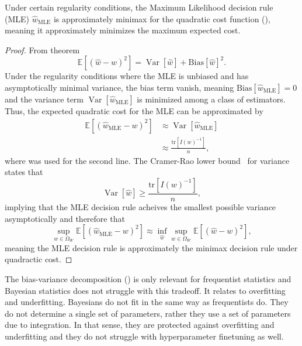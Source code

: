 \begin{corollary}
	\label{cor:MLE_minimax}
	Under certain regularity conditions, the Maximum Likelihood decision rule (MLE) $\hat{w}_{\text{MLE}}$ is approximately minimax for the quadratic cost function (), meaning it approximately minimizes the maximum expected cost.
	
	\begin{proof}
		From theorem 
		\begin{equation}
			\mathbb{E}[(\hat{w}-w)^2] = \operatorname{Var}[\hat{w}]+\text{Bias}[\hat{w}]^2.
		\end{equation}
		Under the regularity conditions where the MLE is unbiased and has asymptotically minimal variance, the bias term vanish, meaning $\text{Bias}[\hat{w}_{\text{MLE}}] = 0$ and the variance term $\operatorname{Var}[\hat{w}_{\text{MLE}}]$ is minimized among a class of estimators. Thus, the expected quadratic cost for the MLE can be approximated by
		\begin{equation}
			\begin{split}
				\mathbb{E}[(\hat{w}_{\text{MLE}}-w)^2] &\approx \operatorname{Var}[\hat{w}_{\text{MLE}}]\\
				&\approx \frac{\text{tr}[I(w)^{-1}]}{n},
			\end{split}
		\end{equation}
		where  was used for the second line. The Cramer-Rao lower bound~\citep{Rao1973Linear} for variance states that 
		\begin{equation}
			\operatorname{Var}[\hat{w}]\geq \frac{\text{tr}[I(w)^{-1}]}{n},
		\end{equation}
		implying that the MLE decision rule acheives the smallest possible variance asymptotically and therefore that 
		\begin{equation}
			\sup_{w\in \Omega_W}\mathbb{E}[(\hat{w}_{\text{MLE}}-w)^2]\approx \inf_{\hat{w}} \sup_{w \in \Omega_W} \mathbb{E}[(\hat{w} - w)^2],
		\end{equation}
		meaning the MLE decision rule is approximately the minimax decision rule under quadractic cost.
	\end{proof}
\end{corollary}

\begin{example}
	The bias-variance decomposition () is only relevant for frequentist statistics and Bayesian statistics does not struggle with this tradeoff. It relates to overfitting and underfitting. Bayesians do not fit in the same way as frequentists do. They do not determine a single set of parameters, rather they use a set of parameters due to integration. In that sense, they are protected against overfitting and underfitting and they do not struggle with hyperparameter finetuning as well.
\end{example}


